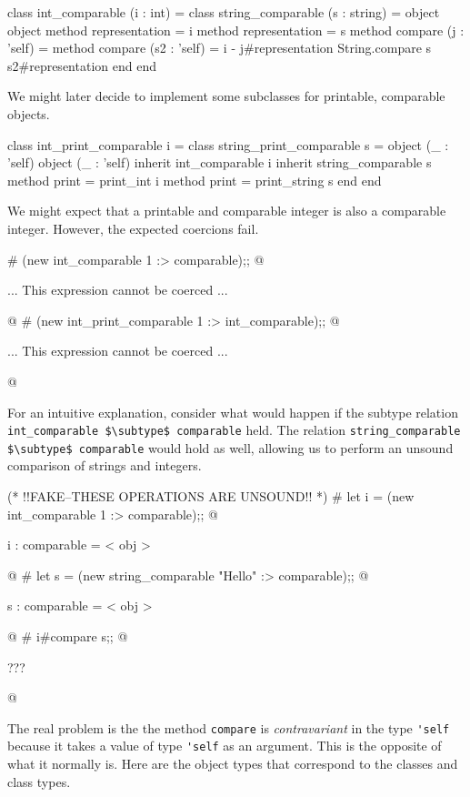 \begin{ocaml}
class int_comparable (i : int) =     class string_comparable (s : string) =
object                               object
   method representation = i            method representation = s
   method compare (j : 'self) =         method compare (s2 : 'self) =
      i - j#representation                 String.compare s s2#representation
end                                  end
\end{ocaml}
%
We might later decide to implement some subclasses for printable, comparable objects.
%
\begin{ocaml}
class int_print_comparable i =       class string_print_comparable s =
object (_ : 'self)                   object (_ : 'self)
   inherit int_comparable i             inherit string_comparable s
   method print = print_int i           method print = print_string s
end                                  end
\end{ocaml}
%
We might expect that a printable and comparable integer is also a comparable integer.  However, the
expected coercions fail.

\begin{ocaml}
# (new int_comparable 1 :> comparable);;
@
\begin{topoutput}
... This expression cannot be coerced ...
\end{topoutput}
@
# (new int_print_comparable 1 :> int_comparable);;
@
\begin{topoutput}
... This expression cannot be coerced ...
\end{topoutput}
@
\end{ocaml}
%
For an intuitive explanation, consider what would happen if the subtype relation
\hbox{\lstinline/int_comparable $\subtype$ comparable/} held.
The relation \hbox{\lstinline/string_comparable $\subtype$ comparable/} would hold as well, allowing us to
perform an unsound comparison of strings and integers.

\begin{ocaml}
(* !!FAKE--THESE OPERATIONS ARE UNSOUND!! *)
# let i = (new int_comparable 1 :> comparable);;
@
\begin{topoutput}
i : comparable = < obj >
\end{topoutput}
@
# let s = (new string_comparable "Hello" :> comparable);;
@
\begin{topoutput}
s : comparable = < obj >
\end{topoutput}
@
# i#compare s;;
@
\begin{topoutput}
???
\end{topoutput}
@
\end{ocaml}
%
The real problem is the the method \hbox{\lstinline/compare/} is \emph{contravariant} in the
type \hbox{\lstinline/'self/} because it takes a value of type \hbox{\lstinline/'self/} as an argument.  This is
the opposite of what it normally is.  Here are the object types that correspond to the classes and
class types.

